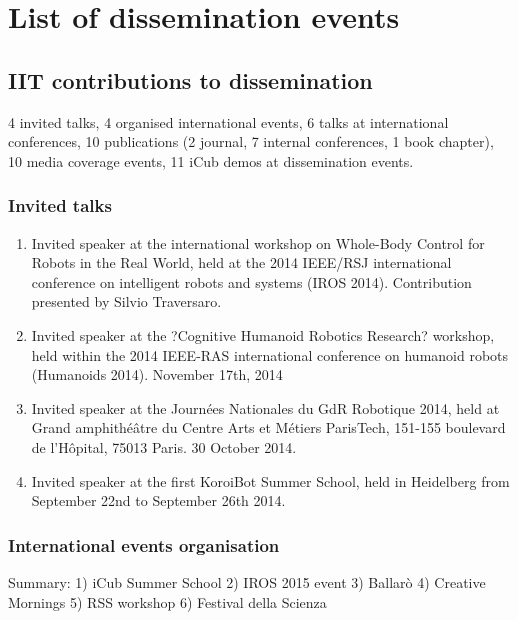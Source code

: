 \appendix
\section{List of dissemination events}

\subsection{IIT contributions to dissemination}

4 invited talks, 4 organised international events, 6 talks at international conferences, 10 publications (2 journal, 7 internal conferences, 1 book chapter), 10 media coverage events, 11 iCub demos at dissemination events.

\subsubsection{Invited talks}

\begin{enumerate}
\item Invited speaker at the international workshop on Whole-Body Control for Robots in the Real World, held at the 2014 IEEE/RSJ international conference on intelligent robots and systems (IROS 2014). Contribution presented by Silvio Traversaro.
\item Invited speaker at the ?Cognitive Humanoid Robotics Research? workshop, held within the 2014 IEEE-RAS international conference on humanoid robots (Humanoids 2014). November 17th, 2014
\item Invited speaker at the Journées Nationales du GdR Robotique 2014, held at Grand amphithéâtre du Centre Arts et Métiers ParisTech, 151-155 boulevard de l'Hôpital, 75013 Paris. 30 October 2014.
\item Invited speaker at the first KoroiBot Summer School, held in Heidelberg from September 22nd to September 26th 2014. 
\end{enumerate}

\subsubsection{International events organisation}

Summary:
1) iCub Summer School
2) IROS 2015 event
3) Ballarò
4) Creative Mornings
5) RSS workshop
6) Festival della Scienza

